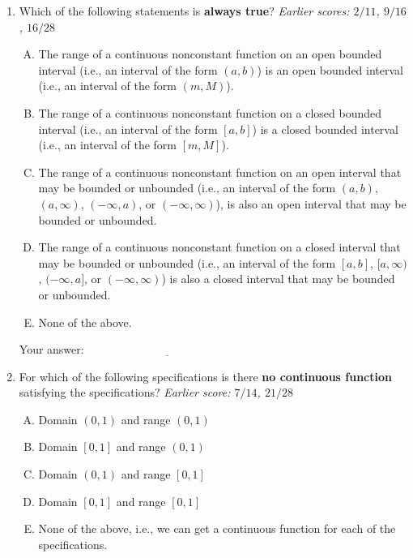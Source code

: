 \documentclass[10pt]{amsart}
\begin{document}
\begin{enumerate}

\item Which of the following statements is {\bf always true}? {\em
  Earlier scores: $2/11$, $9/16$, $16/28$}

  \begin{enumerate}[(A)]
  \item The range of a continuous nonconstant function on an open
    bounded interval (i.e., an interval of the form $(a,b)$) is an
    open bounded interval (i.e., an interval of the form $(m,M)$).
  \item The range of a continuous nonconstant function on a closed
    bounded interval (i.e., an interval of the form $[a,b]$) is a
    closed bounded interval (i.e., an interval of the form $[m,M]$).
  \item The range of a continuous nonconstant function on an open
    interval that may be bounded or unbounded (i.e., an interval of
    the form $(a,b)$,$(a,\infty)$, $(-\infty,a)$, or
    $(-\infty,\infty)$), is also an open interval that may be bounded
    or unbounded.
  \item The range of a continuous nonconstant function on a closed
    interval that may be bounded or unbounded (i.e., an interval of
    the form $[a,b]$, $[a,\infty)$, $(-\infty,a]$, or
    $(-\infty,\infty)$) is also a closed interval that may be bounded
    or unbounded.
  \item None of the above.
  \end{enumerate}

  \vspace{0.05in}
  Your answer: $\underline{\qquad\qquad\qquad\qquad\qquad\qquad\qquad}$
  \vspace{0.05in}

\item For which of the following specifications is there {\bf no
  continuous function} satisfying the specifications? {\em Earlier
  score: $7/14$, $21/28$}

  \begin{enumerate}[(A)]
  \item Domain $(0,1)$ and range $(0,1)$
  \item Domain $[0,1]$ and range $(0,1)$
  \item Domain $(0,1)$ and range $[0,1]$
  \item Domain $[0,1]$ and range $[0,1]$
  \item None of the above, i.e., we can get a continuous function for
    each of the specifications.
  \end{enumerate}


\end{enumerate}
\end{document}
